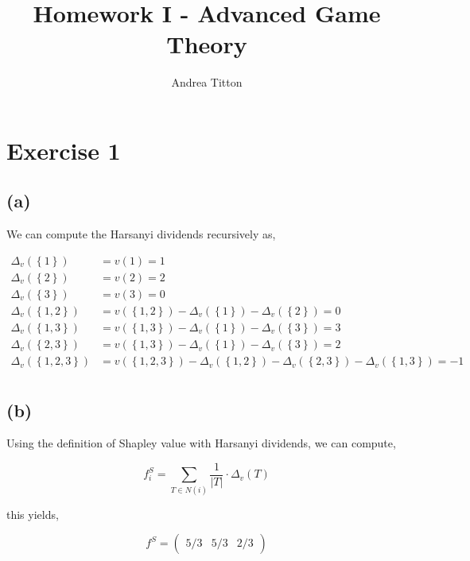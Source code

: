 \documentclass[american]{scrartcl}
\title{Homework I - Advanced Game Theory }
\author{Andrea Titton}
\newcommand{\set}[1]{\left\{#1\right\}}
\newcommand{\abs}[1]{\left\lvert #1 \right\rvert}
\begin{document}

\maketitle

\section*{Exercise 1}

\subsection*{(a)}

We can compute the Harsanyi dividends recursively as,

\begin{equation}
    \begin{split}
        \Delta_v(\set{1}) &= v(1) = 1 \\
        \Delta_v(\set{2}) &= v(2) = 2 \\
        \Delta_v(\set{3}) &= v(3) = 0 \\
        \Delta_v(\set{1, 2}) &= v(\set{1, 2}) - \Delta_v(\set{1}) - \Delta_v(\set{2}) = 0 \\
        \Delta_v(\set{1, 3}) &= v(\set{1, 3}) - \Delta_v(\set{1}) - \Delta_v(\set{3}) = 3 \\
        \Delta_v(\set{2, 3}) &= v(\set{1, 3}) - \Delta_v(\set{1}) - \Delta_v(\set{3}) = 2 \\
        \Delta_v(\set{1, 2, 3}) &= v(\set{1, 2, 3}) - \Delta_v(\set{1, 2}) - \Delta_v(\set{2, 3}) - \Delta_v(\set{1, 3}) = -1  \\
    \end{split}
\end{equation}

\subsection*{(b)}

Using the definition of Shapley value with Harsanyi dividends, we can compute,

\begin{equation} \label{shapley}
    f_i^S = \sum_{T \in N(i)} \frac{1}{\abs{T}} \cdot \Delta_v(T)
\end{equation}

this yields,

\begin{equation*}
    f^S = \begin{pmatrix}
        5/3 & 5/3 & 2/3
    \end{pmatrix}
\end{equation*}
\end{document}
